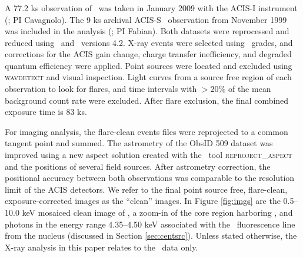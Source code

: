 \documentclass[useAMS,usenatbib]{mn2e}
\begin{document}
\subsubsection{\chandra}

A 77.2 ks observation of \irs\ was taken in January 2009 with the
ACIS-I instrument (; PI
Cavagnolo). The 9 ks archival ACIS-S \chandra\ observation from
November 1999 was included in the analysis (; PI Fabian). Both datasets were
reprocessed and reduced using \ciao\ and \caldb\ versions 4.2. X-ray
events were selected using \asca\ grades, and corrections for the ACIS
gain change, charge transfer inefficiency, and degraded quantum
efficiency were applied. Point sources were located and excluded using
{\textsc{wavdetect}} and visual inspection. Light curves from a source
free region of each observation to look for flares, and time intervals
with $> 20\%$ of the mean background count rate were excluded. After
flare exclusion, the final combined exposure time is 83 ks.

For imaging analysis, the flare-clean events files were reprojected to
a common tangent point and summed. The astrometry of the ObsID 509
dataset was improved using a new aspect solution created with the
\ciao\ tool {\textsc{reproject\_aspect}} and the positions of several
field sources. After astrometry correction, the positional accuracy
between both observations was comparable to the resolution limit of
the ACIS detectors. We refer to the final point source free,
flare-clean, exposure-corrected images as the ``clean'' images. In
Figure \ref{fig:imgs} are the 0.5--10.0 keV mosaiced clean image of
\rxj, a zoom-in of the core region harboring \irs, and photons in the
energy range 4.35--4.50 keV associated with the \feka\ fluorescence
line from the nucleus (discussed in Section \ref{sec:centsrc}). Unless
stated otherwise, the X-ray analysis in this paper relates to the
\chandra\ data only.

\subsubsection{\xmm}
\end{document}
